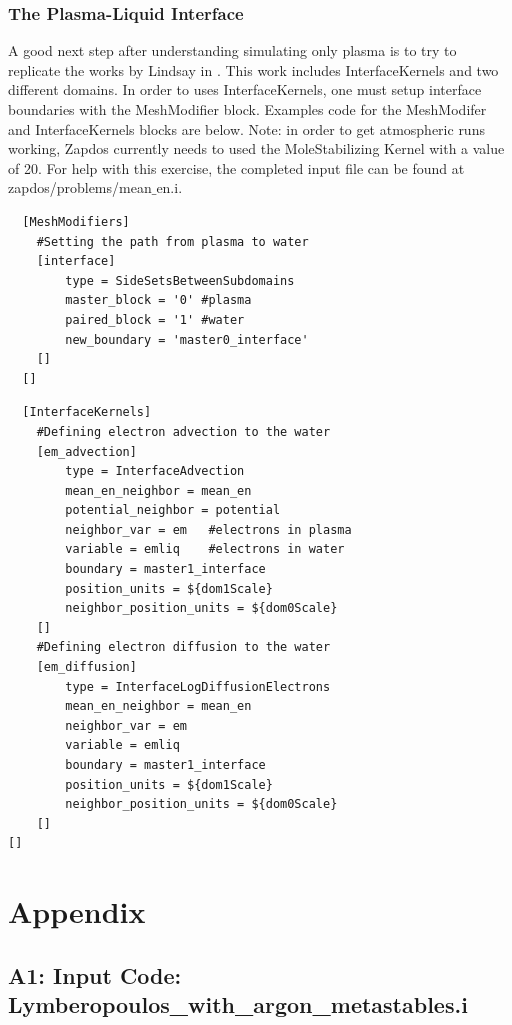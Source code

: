 \documentclass[final]{report}
\begin{document}
  \subsection{The Plasma-Liquid Interface}
  A good next step after understanding simulating only plasma is to try to replicate the works by Lindsay in \cite{plasma_water}. This work includes InterfaceKernels and two different domains. In order to uses InterfaceKernels, one must setup interface boundaries with the MeshModifier block. Examples code for the MeshModifer and InterfaceKernels blocks are below. Note: in order to get atmospheric runs working, Zapdos currently needs to used the MoleStabilizing Kernel with a value of 20. For help with this exercise, the completed input file can be found at \\ zapdos/problems/mean$\_$en.i.

  \begin{verbatim}
  [MeshModifiers]
    #Setting the path from plasma to water
    [interface]
        type = SideSetsBetweenSubdomains
        master_block = '0' #plasma
        paired_block = '1' #water
        new_boundary = 'master0_interface'
    []
  []
  \end{verbatim}

  \begin{verbatim}
  [InterfaceKernels]
    #Defining electron advection to the water
    [em_advection]
        type = InterfaceAdvection
        mean_en_neighbor = mean_en
        potential_neighbor = potential
        neighbor_var = em   #electrons in plasma
        variable = emliq    #electrons in water
        boundary = master1_interface
        position_units = ${dom1Scale}
        neighbor_position_units = ${dom0Scale}
    []
    #Defining electron diffusion to the water
    [em_diffusion]
        type = InterfaceLogDiffusionElectrons
        mean_en_neighbor = mean_en
        neighbor_var = em
        variable = emliq
        boundary = master1_interface
        position_units = ${dom1Scale}
        neighbor_position_units = ${dom0Scale}
    []
[]
  \end{verbatim}

  \chapter{Appendix} \label{appendix}
  \section*{A1: Input Code: Lymberopoulos\_with\_argon\_metastables.i}
  
\end{document}
